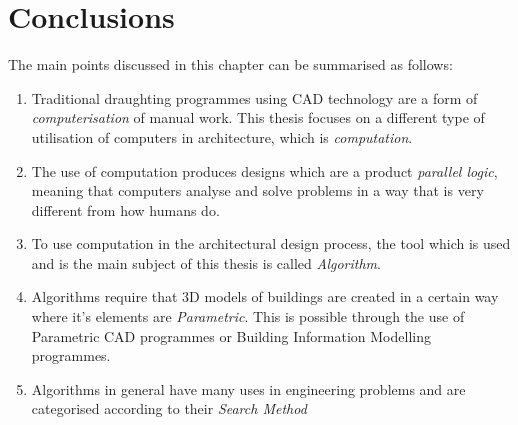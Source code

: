 \clearpage
\section{Conclusions}

The main points discussed in this chapter can be summarised as follows:
\vspace{-0.3cm}
\begin{enumerate}
	\item Traditional draughting programmes using CAD technology are a form of \emph{computerisation} of manual work. This thesis focuses on a different type of utilisation of computers in architecture, which is \emph{computation}.
	\item The use of computation produces designs which are a product \emph{parallel logic}, meaning that computers analyse and solve problems in a way that is very different from how humans do.
	\item To use computation in the architectural design process, the tool which is used and is the main subject of this thesis is called \emph{Algorithm}.
	\item Algorithms require that 3D models of buildings are created in a certain way where it's elements are \emph{Parametric}. This is possible through the use of Parametric CAD programmes or Building Information Modelling programmes.
	\item Algorithms in general have many uses in engineering problems and are categorised according to their \emph{Search Method}
\end{enumerate}
